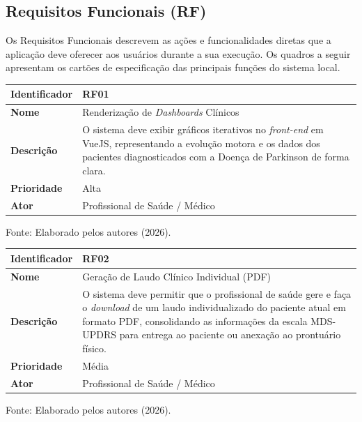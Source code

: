 \subsection{Requisitos Funcionais (RF)}
Os Requisitos Funcionais descrevem as ações e funcionalidades diretas que a aplicação deve oferecer aos usuários durante a sua execução. Os quadros a seguir apresentam os cartões de especificação das principais funções do sistema local.

\begin{quadro}[H]
\centering
\caption{Especificação do Requisito Funcional 01 (RF01) - Renderização de Gráficos}
\label{quadro:rf01}
\begin{tabular}{|l|p{11cm}|}
\hline
\textbf{Identificador} & \textbf{RF01} \\ \hline
\textbf{Nome} & Renderização de \textit{Dashboards} Clínicos \\ \hline
\textbf{Descrição} & O sistema deve exibir gráficos iterativos no \textit{front-end} em VueJS, representando a evolução motora e os dados dos pacientes diagnosticados com a Doença de Parkinson de forma clara. \\ \hline
\textbf{Prioridade} & Alta \\ \hline
\textbf{Ator} & Profissional de Saúde / Médico \\ \hline
\end{tabular}
\centerline{\footnotesize Fonte: Elaborado pelos autores (2026).}
\end{quadro}

\begin{quadro}[H]
\centering
\caption{Especificação do Requisito Funcional 02 (RF02) - Exportação de Dados}
\label{quadro:rf02}
\begin{tabular}{|l|p{11cm}|}
\hline
\textbf{Identificador} & \textbf{RF02} \\ \hline
\textbf{Nome} & Geração de Laudo Clínico Individual (PDF) \\ \hline
\textbf{Descrição} & O sistema deve permitir que o profissional de saúde gere e faça o \textit{download} de um laudo individualizado do paciente atual em formato PDF, consolidando as informações da escala MDS-UPDRS para entrega ao paciente ou anexação ao prontuário físico. \\ \hline
\textbf{Prioridade} & Média \\ \hline
\textbf{Ator} & Profissional de Saúde / Médico \\ \hline
\end{tabular}
\centerline{\footnotesize Fonte: Elaborado pelos autores (2026).}
\end{quadro}

